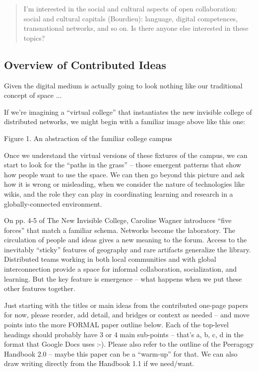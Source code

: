 \documentclass{acm_proc_article-sp}
\newenvironment{cframed}[1][blue]
  {\def\FrameCommand{\fboxsep=\FrameSep\fcolorbox{#1}{white}}%
    \MakeFramed {\advance\hsize-\width \FrameRestore}}
  {\endMakeFramed}
\begin{document}
\begin{cframed}[scarlet]
\begin{quote}
I'm interested in the social and cultural aspects of open collaboration: social and cultural capitals (Bourdieu): language, digital competences, transnational networks, and so on. Is there anyone else interested in these topics?
\end{quote}

\subsection{Overview of Contributed Ideas}

Given the digital medium is actually going to look nothing like our traditional concept of space ...

If we're imagining a ``virtual college'' that instantiates the new invisible college of distributed networks, we might begin with a familiar image above like this one:

Figure 1. An abstraction of the familiar college campus

Once we understand the virtual versions of these fixtures of the campus, we can start to look for the ``paths in the grass'' -- those emergent patterns that show how people want to use the space. We can then go beyond this picture and ask how it is wrong or misleading, when we consider the nature of technologies like wikis, and the role they can play in coordinating learning and research in a globally-connected environment.

On pp. 4-5 of The New Invisible College, Caroline Wagner introduces ``five forces'' that match a familiar schema. Networks become the laboratory. The circulation of people and ideas gives a new meaning to the forum. Access to the inevitably ``sticky'' features of geography and rare artifacts generalize the library. Distributed teams working in both local communities and with global interconnection provide a space for informal collaboration, socialization, and learning. But the key feature is emergence -- what happens when we put these other features together.

Just starting with the titles or main ideas from the contributed one-page papers for now, please reorder, add detail, and bridges or context as needed -- and move points into the more FORMAL paper outline below. Each of the top-level headings should probably have 3 or 4 main sub-points -- that's a, b, c, d in the format that Google Docs uses :-). Please also refer to the outline of the Peeragogy Handbook 2.0 -- maybe this paper can be a ``warm-up'' for that. We can also draw writing directly from the Handbook 1.1 if we need/want.


\end{cframed}
\end{document}
